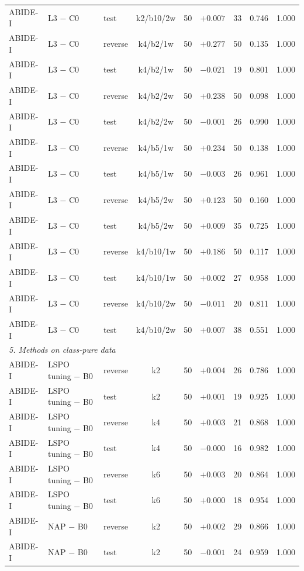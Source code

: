 \begin{longtable}{lllcrrrrr}
ABIDE-I & L3 $-$ C0 & test & k2/b10/2w & 50 & $+0.007$ & 33 & 0.746 & 1.000\\
ABIDE-I & L3 $-$ C0 & reverse & k4/b2/1w & 50 & $+0.277$ & 50 & 0.135 & 1.000\\
ABIDE-I & L3 $-$ C0 & test & k4/b2/1w & 50 & $-0.021$ & 19 & 0.801 & 1.000\\
ABIDE-I & L3 $-$ C0 & reverse & k4/b2/2w & 50 & $+0.238$ & 50 & 0.098 & 1.000\\
ABIDE-I & L3 $-$ C0 & test & k4/b2/2w & 50 & $-0.001$ & 26 & 0.990 & 1.000\\
ABIDE-I & L3 $-$ C0 & reverse & k4/b5/1w & 50 & $+0.234$ & 50 & 0.138 & 1.000\\
ABIDE-I & L3 $-$ C0 & test & k4/b5/1w & 50 & $-0.003$ & 26 & 0.961 & 1.000\\
ABIDE-I & L3 $-$ C0 & reverse & k4/b5/2w & 50 & $+0.123$ & 50 & 0.160 & 1.000\\
ABIDE-I & L3 $-$ C0 & test & k4/b5/2w & 50 & $+0.009$ & 35 & 0.725 & 1.000\\
ABIDE-I & L3 $-$ C0 & reverse & k4/b10/1w & 50 & $+0.186$ & 50 & 0.117 & 1.000\\
ABIDE-I & L3 $-$ C0 & test & k4/b10/1w & 50 & $+0.002$ & 27 & 0.958 & 1.000\\
ABIDE-I & L3 $-$ C0 & reverse & k4/b10/2w & 50 & $-0.011$ & 20 & 0.811 & 1.000\\
ABIDE-I & L3 $-$ C0 & test & k4/b10/2w & 50 & $+0.007$ & 38 & 0.551 & 1.000\\
\multicolumn{9}{l}{\textit{5. Methods on class-pure data}}\\
ABIDE-I & LSPO tuning $-$ B0 & reverse & k2 & 50 & $+0.004$ & 26 & 0.786 & 1.000\\
ABIDE-I & LSPO tuning $-$ B0 & test & k2 & 50 & $+0.001$ & 19 & 0.925 & 1.000\\
ABIDE-I & LSPO tuning $-$ B0 & reverse & k4 & 50 & $+0.003$ & 21 & 0.868 & 1.000\\
ABIDE-I & LSPO tuning $-$ B0 & test & k4 & 50 & $-0.000$ & 16 & 0.982 & 1.000\\
ABIDE-I & LSPO tuning $-$ B0 & reverse & k6 & 50 & $+0.003$ & 20 & 0.864 & 1.000\\
ABIDE-I & LSPO tuning $-$ B0 & test & k6 & 50 & $+0.000$ & 18 & 0.954 & 1.000\\
ABIDE-I & NAP $-$ B0 & reverse & k2 & 50 & $+0.002$ & 29 & 0.866 & 1.000\\
ABIDE-I & NAP $-$ B0 & test & k2 & 50 & $-0.001$ & 24 & 0.959 & 1.000\\

\end{longtable}
